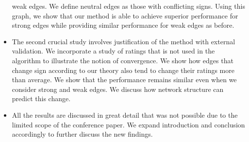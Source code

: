 \documentclass[11pt]{article}
\begin{document}
\begin{itemize}
  weak edges. We define neutral edges as those with conflicting
  signs. Using this graph, we show that our method is able to achieve
  superior performance for strong edges while providing similar
  performance for weak edges as before.
\item The second crucial study involves justification of the method
  with external validation. We incorporate a study of ratings that is
  not used in the algorithm to illustrate the notion of
  convergence. We show how edges that change sign according to our
  theory also tend to change their ratings more than average. We show
  that the performance remains similar even when we consider strong
  and weak edges. We discuss how network structure can predict this
  change.
\item All the results are discussed in great detail that was not
  possible due to the limited scope of the conference paper. We expand
  introduction and conclusion accordingly to further discuss the new
  findings.
\end{itemize}
\end{document}
